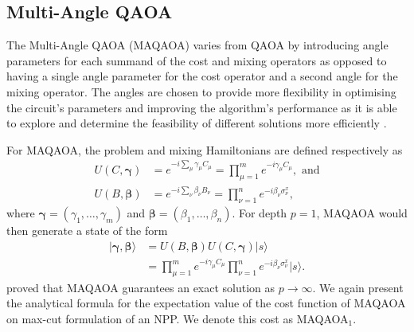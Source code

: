 \subsection{Multi-Angle QAOA}
    
    The Multi-Angle QAOA (MAQAOA) varies from QAOA by introducing angle parameters for each summand of the cost and mixing operators as opposed to having a single angle parameter for the cost operator and a second angle for the mixing operator. The angles are chosen to provide more flexibility in optimising the circuit's parameters and improving the algorithm's performance as it is able to explore and determine the feasibility of different solutions more efficiently \cite{herrman2022multi}. 

    For MAQAOA, the problem and mixing Hamiltonians are defined respectively as 
    \begin{align}
        U(C,\pmb{\gamma}) &= e^{-i\sum_\mu\gamma_\mu C_\mu}= \prod^m_{\mu=1}e^{-i\gamma_\mu C_\mu}, \text{ and} \\
        U(B,\pmb{\beta}) &= e^{-i\sum_\nu\beta_\nu B_\nu} = \prod^n_{\nu=1}e^{-i\beta_\nu \sigma^x_\nu},
    \end{align}
    where $\pmb{\gamma} = (\gamma_1,\dots,\gamma_m)$ and $\pmb{\beta} = (\beta_1,\dots,\beta_n)$. For depth $p=1$, MAQAOA would then generate a state of the form 
    \begin{align}
        |\pmb{\gamma},\pmb{\beta}\rangle &= U(B,\pmb{\beta})U(C,\pmb{\gamma})|s\rangle \nonumber \\
        &= \prod^m_{\mu=1}e^{-i\gamma_\mu C_\mu}\prod^n_{\nu=1}e^{-i\beta_\nu \sigma^x_\nu}|s\rangle.
    \end{align}
    \citet{herrman2022multi} proved that MAQAOA guarantees an exact solution as $p\to \infty$. We again present the analytical formula for the expectation value of the cost function of MAQAOA on max-cut formulation of an NPP. We denote this cost as MAQAOA$_1$.   


